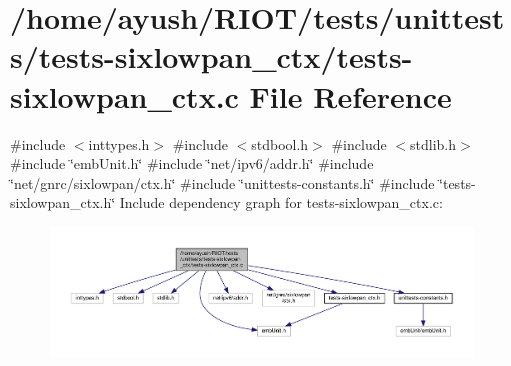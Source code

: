 \hypertarget{tests-sixlowpan__ctx_8c}{}\section{/home/ayush/\+R\+I\+O\+T/tests/unittests/tests-\/sixlowpan\+\_\+ctx/tests-\/sixlowpan\+\_\+ctx.c File Reference}
\label{tests-sixlowpan__ctx_8c}
{\ttfamily \#include $<$inttypes.\+h$>$}\newline
{\ttfamily \#include $<$stdbool.\+h$>$}\newline
{\ttfamily \#include $<$stdlib.\+h$>$}\newline
{\ttfamily \#include \char`\"{}emb\+Unit.\+h\char`\"{}}\newline
{\ttfamily \#include \char`\"{}net/ipv6/addr.\+h\char`\"{}}\newline
{\ttfamily \#include \char`\"{}net/gnrc/sixlowpan/ctx.\+h\char`\"{}}\newline
{\ttfamily \#include \char`\"{}unittests-\/constants.\+h\char`\"{}}\newline
{\ttfamily \#include \char`\"{}tests-\/sixlowpan\+\_\+ctx.\+h\char`\"{}}\newline
Include dependency graph for tests-\/sixlowpan\+\_\+ctx.c\+:
\nopagebreak
\begin{figure}[H]
\begin{center}
\leavevmode
\includegraphics[width=350pt]{tests-sixlowpan__ctx_8c__incl}
\end{center}
\end{figure}

